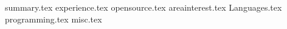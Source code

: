 \documentclass[11pt, a4paper]{awesome-cv}
\newcommand*{\sectiondir}{resume/}
\begin{document}
\makecvheader

{summary.tex}
{experience.tex}
{opensource.tex}
{areainterest.tex}
{Languages.tex}
{programming.tex}
{misc.tex}
\end{document}
